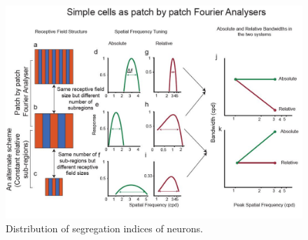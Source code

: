	\begin{figure}[H]
		
		\includegraphics[width=\linewidth]{LinearV1/scheme.jpg}
		\caption{Distribution of segregation indices of neurons.}
		\label{fig:summary}
	\end{figure}

